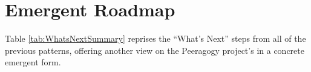 \section{Emergent Roadmap} \label{sec:Distributed_Roadmap}

Table \ref{tab:WhatsNextSummary} reprises the ``What's Next'' steps from all of the previous
patterns, offering another view on the Peeragogy project's
 in a concrete emergent form.









